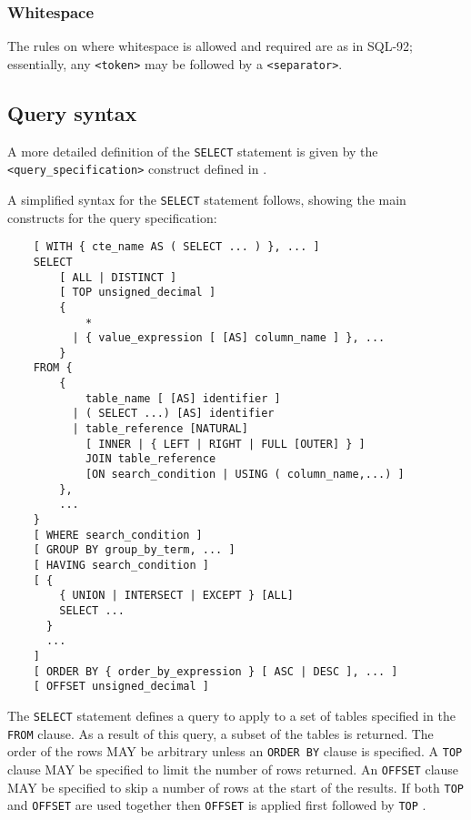 \documentclass[11pt,a4paper]{ivoa}
\begin{document}
\subsubsection{Whitespace}
\label{sec:whitespace}

The rules on where whitespace is allowed and required are as in SQL-92;
essentially, any \verb:<token>: may be followed by a \verb:<separator>:.

\clearpage %
\subsection{Query syntax}
\label{sec:syntax}

A more detailed definition of the \verb:SELECT: statement is given by the \verb:<query_specification>:
construct defined in .

A simplified syntax for the \verb:SELECT: statement follows, showing the main constructs for
the query specification:

\begin{verbatim}
    [ WITH { cte_name AS ( SELECT ... ) }, ... ]
    SELECT
        [ ALL | DISTINCT ]
        [ TOP unsigned_decimal ]
        {
            *
          | { value_expression [ [AS] column_name ] }, ...
        }
    FROM {
        {
            table_name [ [AS] identifier ]
          | ( SELECT ...) [AS] identifier
          | table_reference [NATURAL]
            [ INNER | { LEFT | RIGHT | FULL [OUTER] } ]
            JOIN table_reference
            [ON search_condition | USING ( column_name,...) ]
        },
        ...
    }
    [ WHERE search_condition ]
    [ GROUP BY group_by_term, ... ]
    [ HAVING search_condition ]
    [ {
        { UNION | INTERSECT | EXCEPT } [ALL]
        SELECT ...
      }
      ...
    ]
    [ ORDER BY { order_by_expression } [ ASC | DESC ], ... ]
    [ OFFSET unsigned_decimal ]
\end{verbatim}

The \verb:SELECT: statement defines a query to apply to a set of tables specified
in the \verb:FROM: clause. As a result of this query, a subset of the tables
is returned.
The order of the rows MAY be arbitrary unless an \verb:ORDER BY: clause is specified.
A \verb:TOP: clause MAY be specified to limit the number of rows returned.
An \verb:OFFSET: clause MAY be specified to skip a number of rows at the start
of the results.
If both \verb:TOP: and \verb:OFFSET: are used together then \verb:OFFSET: is applied
first followed by \verb:TOP: .
\end{document}
